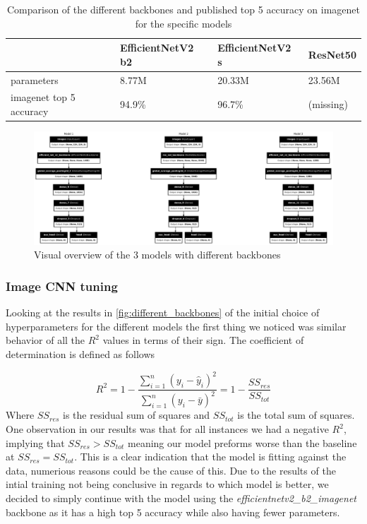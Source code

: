 \documentclass[12pt,a4paper,oneside]{article}
\begin{document}
\begin{table}[!h]
    \centering
    \begin{tabular}{@{}llll@{}}
    \toprule
    & EfficientNetV2 b2 & EfficientNetV2 s & ResNet50 \\ \midrule
    parameters              & 8.77M             & 20.33M           & 23.56M   \\
    imagenet top 5 accuracy & 94.9\%            & 96.7\%           & (missing)       \\ \bottomrule
\end{tabular}
\caption{Comparison of the different backbones and published top 5 accuracy on imagenet for the specific models}
\label{tab:backbone_comparison}
\end{table}

\begin{figure}[!h]
    \centering
    \includegraphics[width=1\textwidth]{assets/different_models.png}
    \caption{Visual overview of the 3 models with different backbones}
    \label{fig:models_overview}
\end{figure}

\subsubsection{Image CNN tuning}

Looking at the results in \ref{fig:different_backbones} of the initial choice of hyperparameters for the different models the first thing we noticed was similar behavior of all the $R^2$ values in terms of their sign. The coefficient of determination is defined as follows 

\[
    R^2 = 1 - \frac{\sum_{i=1}^{n} (y_i - \hat{y}_i)^2}{\sum_{i=1}^{n} (y_i - \bar{y})^2} = 1 - \frac{SS_{res}}{SS_{tot}}  
\]
Where $SS_{res}$ is the residual sum of squares and $SS_{tot}$ is the total sum of squares. One observation in our results was that for all instances we had a negative $R^2$, implying that $SS_{res} > SS_{tot}$ meaning our model preforms worse than the baseline at $SS_{res} = SS_{tot}$. This is a clear indication that the model is fitting against the data, numerious reasons could be the cause of this. Due to the results of the intial training not being conclusive in regards to which model is better, we decided to simply continue with the model using the \textit{efficientnetv2\_b2\_imagenet} backbone as it has a high top 5 accuracy while also having fewer parameters.
\end{document}
